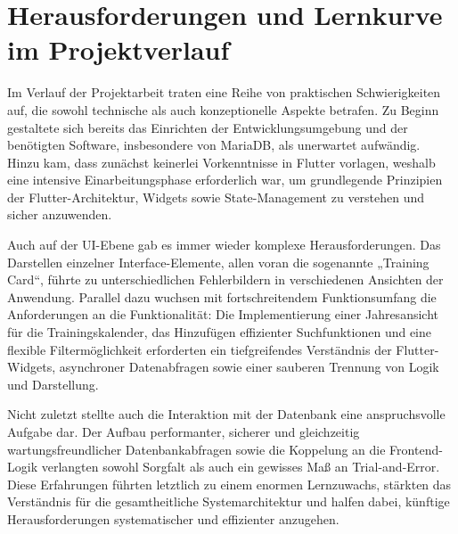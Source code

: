 \chapter{Herausforderungen und Lernkurve im Projektverlauf}
Im Verlauf der Projektarbeit traten eine Reihe von praktischen Schwierigkeiten auf, die sowohl technische als auch
konzeptionelle Aspekte betrafen. Zu Beginn gestaltete sich bereits das Einrichten der Entwicklungsumgebung und der 
benötigten Software, insbesondere von MariaDB, als unerwartet aufwändig. Hinzu kam, dass zunächst keinerlei Vorkenntnisse 
in Flutter vorlagen, weshalb eine intensive Einarbeitungsphase erforderlich war, um grundlegende Prinzipien der Flutter-Architektur,
Widgets sowie State-Management zu verstehen und sicher anzuwenden.

Auch auf der UI-Ebene gab es immer wieder komplexe Herausforderungen. Das Darstellen einzelner Interface-Elemente, allen voran die
sogenannte „Training Card“, führte zu unterschiedlichen Fehlerbildern in verschiedenen Ansichten der Anwendung. Parallel dazu 
wuchsen mit fortschreitendem Funktionsumfang die Anforderungen an die Funktionalität: Die Implementierung einer Jahresansicht
für die Trainingskalender, das Hinzufügen effizienter Suchfunktionen und eine flexible Filtermöglichkeit erforderten ein
tiefgreifendes Verständnis der Flutter-Widgets, asynchroner Datenabfragen sowie einer sauberen Trennung von Logik und Darstellung.

Nicht zuletzt stellte auch die Interaktion mit der Datenbank eine anspruchsvolle Aufgabe dar. Der Aufbau performanter,
sicherer und gleichzeitig wartungsfreundlicher Datenbankabfragen sowie die Koppelung an die Frontend-Logik verlangten
sowohl Sorgfalt als auch ein gewisses Maß an Trial-and-Error. Diese Erfahrungen führten letztlich zu einem enormen Lernzuwachs,
stärkten das Verständnis für die gesamtheitliche Systemarchitektur und halfen dabei, künftige Herausforderungen systematischer
und effizienter anzugehen.